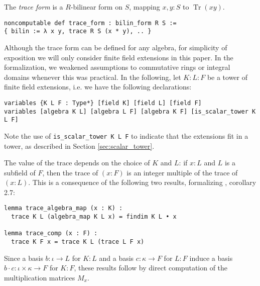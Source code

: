 \documentclass{lipics-v2021}
\newcommand{\lean}[1]{\texttt{#1}\xspace} %
\DeclareMathOperator{\Tr}{\mathrm{Tr}}
\begin{document}
The \emph{trace form} is a $R$-bilinear form on $S$, mapping $x, y : S$ to $\Tr(xy)$.
\begin{lstlisting}
noncomputable def trace_form : bilin_form R S :=
{ bilin := λ x y, trace R S (x * y), .. }
\end{lstlisting}

Although the trace form can be defined for any algebra,
for simplicity of exposition we will only consider finite field extensions in this paper.
In the formalization, we weakened assumptions to commutative rings or integral domains whenever this was practical.
In the following, let $K : L : F$ be a tower of finite field extensions,
i.e. we have the following declarations:
\begin{lstlisting}
variables {K L F : Type*} [field K] [field L] [field F]
variables [algebra K L] [algebra L F] [algebra K F] [is_scalar_tower K L F]
\end{lstlisting}
Note the use of \lean{is\_scalar\_tower K L F} to indicate that the extensions fit in a tower, as described in Section \ref{sec:scalar_tower}.

The value of the trace depends on the choice of $K$ and $L$: if $x : L$ and $L$ is a subfield of $F$,
then the trace of $(x : F)$ is an integer multiple of the trace of $(x : L)$.
This is a consequence of the following two results, formalizing \cite{Neukirch}, corollary 2.7:
\begin{lstlisting}
lemma trace_algebra_map (x : K) :
  trace K L (algebra_map K L x) = findim K L • x

lemma trace_comp (x : F) :
  trace K F x = trace K L (trace L F x)
\end{lstlisting}
Since a basis $b : \iota \to L$ for $K : L$ and a basis $c : \kappa \to F$ for $L : F$ induce a basis $b \cdot c : \iota \times \kappa \to F$ for $K : F$,
these results follow by direct computation of the multiplication matrices $M_x$.
\end{document}
